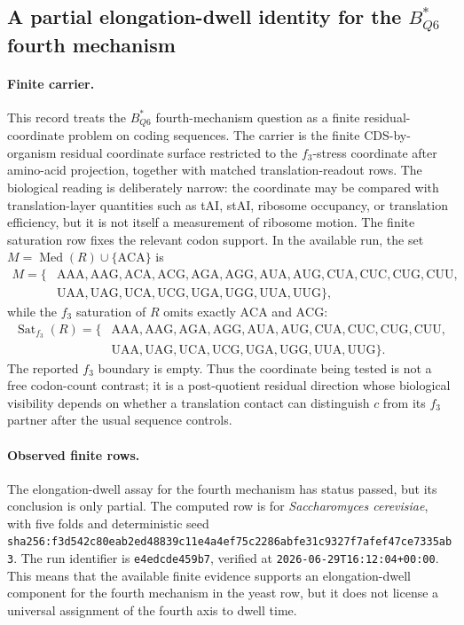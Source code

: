 \subsection{A partial elongation-dwell identity for the $B^{\ast}_{Q6}$ fourth mechanism}
\label{sec:bioreality-q6-f3-elongation-dwell}

\paragraph{Finite carrier.}
This record treats the $B^{\ast}_{Q6}$ fourth-mechanism question as a finite residual-coordinate problem on coding sequences.  The carrier is the finite CDS-by-organism residual coordinate surface restricted to the $f_3$-stress coordinate after amino-acid projection, together with matched translation-readout rows.  The biological reading is deliberately narrow: the coordinate may be compared with translation-layer quantities such as tAI, stAI, ribosome occupancy, or translation efficiency, but it is not itself a measurement of ribosome motion.  The finite saturation row fixes the relevant codon support.  In the available run, the set $M=\operatorname{Med}(R)\cup\{\mathrm{ACA}\}$ is
$$
\begin{aligned}
M=\{&\mathrm{AAA},\mathrm{AAG},\mathrm{ACA},\mathrm{ACG},\mathrm{AGA},\mathrm{AGG},\mathrm{AUA},\mathrm{AUG},\mathrm{CUA},\mathrm{CUC},\mathrm{CUG},\mathrm{CUU},\\
&\mathrm{UAA},\mathrm{UAG},\mathrm{UCA},\mathrm{UCG},\mathrm{UGA},\mathrm{UGG},\mathrm{UUA},\mathrm{UUG}\},
\end{aligned}
$$
while the $f_3$ saturation of $R$ omits exactly $\mathrm{ACA}$ and $\mathrm{ACG}$:
$$
\begin{aligned}
\operatorname{Sat}_{f_3}(R)=\{&\mathrm{AAA},\mathrm{AAG},\mathrm{AGA},\mathrm{AGG},\mathrm{AUA},\mathrm{AUG},\mathrm{CUA},\mathrm{CUC},\mathrm{CUG},\mathrm{CUU},\\
&\mathrm{UAA},\mathrm{UAG},\mathrm{UCA},\mathrm{UCG},\mathrm{UGA},\mathrm{UGG},\mathrm{UUA},\mathrm{UUG}\}.
\end{aligned}
$$
The reported $f_3$ boundary is empty.  Thus the coordinate being tested is not a free codon-count contrast; it is a post-quotient residual direction whose biological visibility depends on whether a translation contact can distinguish $c$ from its $f_3$ partner after the usual sequence controls.

\paragraph{Observed finite rows.}
The elongation-dwell assay for the fourth mechanism has status passed, but its conclusion is only partial.  The computed row is for \textit{Saccharomyces cerevisiae}, with five folds and deterministic seed \texttt{sha256:f3d542c80eab2ed48839c11e4a4ef75c2286abfe31c9327f7afef47ce7335ab3}.  The run identifier is \texttt{e4edcde459b7}, verified at \texttt{2026-06-29T16:12:04+00:00}.  This means that the available finite evidence supports an elongation-dwell component for the fourth mechanism in the yeast row, but it does not license a universal assignment of the fourth axis to dwell time.

